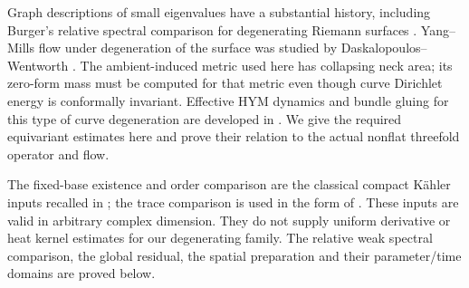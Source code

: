 Graph descriptions of small eigenvalues have a substantial history,
including Burger's relative spectral comparison for degenerating
Riemann surfaces \cite{burger}. Yang--Mills flow under degeneration
of the surface was studied by Daskalopoulos--Wentworth
\cite{daskalopoulos-wentworth}. The ambient-induced metric used
here has collapsing neck area; its zero-form mass must be computed
for that metric even though curve Dirichlet energy is conformally
invariant. Effective HYM dynamics and bundle gluing for this type
of curve degeneration are developed in
\cite{wuebben-effective,wuebben-gluing}. We give the required
equivariant estimates here and prove their relation to the actual
nonflat threefold operator and flow.

The fixed-base existence and order comparison are the classical
compact K\"ahler inputs recalled in \cite[Section 4.1]{hkkp};
the trace comparison is used in the form of
\cite[Proposition 2.4]{wang}. These inputs are valid in arbitrary
complex dimension. They do not supply uniform derivative or heat
kernel estimates for our degenerating family. The relative weak
spectral comparison, the global residual, the spatial preparation
and their parameter/time domains are proved below.
